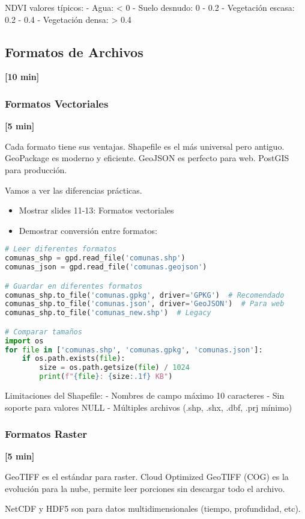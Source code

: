 \documentclass[11pt,a4paper]{article}
\newcommand{\tiempo}[1]{\textcolor{timecolor}{\textbf{[#1]}}}
\newcommand{\decir}[1]{\begin{tcolorbox}[colback=blue!5,colframe=usachblue,title={DECIR}]#1\end{tcolorbox}}
\newcommand{\hacer}[1]{\begin{tcolorbox}[colback=green!5,colframe=green!50!black,title={HACER}]#1\end{tcolorbox}}
\newcommand{\nota}[1]{\begin{tcolorbox}[colback=yellow!10,colframe=orange,title={NOTA}]#1\end{tcolorbox}}
\newcommand{\alerta}[1]{\begin{tcolorbox}[colback=red!5,colframe=red,title={ALERTA}]#1\end{tcolorbox}}
\begin{document}
\nota{
NDVI valores típicos:
- Agua: < 0
- Suelo desnudo: 0 - 0.2
- Vegetación escasa: 0.2 - 0.4
- Vegetación densa: > 0.4
}

\subsection{Formatos de Archivos} \tiempo{10 min}

\subsubsection{Formatos Vectoriales} \tiempo{5 min}

\decir{
Cada formato tiene sus ventajas. Shapefile es el más universal pero antiguo. GeoPackage es moderno y eficiente. GeoJSON es perfecto para web. PostGIS para producción.

Vamos a ver las diferencias prácticas.
}

\hacer{
\begin{itemize}
    \item Mostrar slides 11-13: Formatos vectoriales
    \item Demostrar conversión entre formatos:
\end{itemize}
}

\begin{lstlisting}[language=Python]
# Leer diferentes formatos
comunas_shp = gpd.read_file('comunas.shp')
comunas_json = gpd.read_file('comunas.geojson')

# Guardar en diferentes formatos
comunas_shp.to_file('comunas.gpkg', driver='GPKG')  # Recomendado
comunas_shp.to_file('comunas.json', driver='GeoJSON')  # Para web
comunas_shp.to_file('comunas_new.shp')  # Legacy

# Comparar tamaños
import os
for file in ['comunas.shp', 'comunas.gpkg', 'comunas.json']:
    if os.path.exists(file):
        size = os.path.getsize(file) / 1024
        print(f"{file}: {size:.1f} KB")
\end{lstlisting}

\alerta{
Limitaciones del Shapefile:
- Nombres de campo máximo 10 caracteres
- Sin soporte para valores NULL
- Múltiples archivos (.shp, .shx, .dbf, .prj mínimo)
}

\subsubsection{Formatos Raster} \tiempo{5 min}

\decir{
GeoTIFF es el estándar para raster. Cloud Optimized GeoTIFF (COG) es la evolución para la nube, permite leer porciones sin descargar todo el archivo.

NetCDF y HDF5 son para datos multidimensionales (tiempo, profundidad, etc).
}
\end{document}
